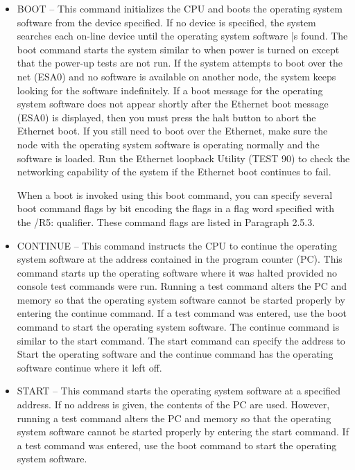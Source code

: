 \begin{itemize}
\item BOOT -- This command initializes the CPU and boots the operating 
system software from the device specified. If no device is specified, the
system searches each on-line device until the operating system software
|s found. The boot command starts the system similar to when power
is turned on except that the power-up tests are not run. If the system
attempts to boot over the net (ESA0) and no software is available on
another node, the system keeps looking for the software indefinitely.
If a boot message for the operating system software does not appear
shortly after the Ethernet boot message (ESA0) is displayed, then you
must press the halt button to abort the Ethernet boot. If you still need
to boot over the Ethernet, make sure the node with the operating system 
software is operating normally and the software is loaded. Run the
Ethernet loopback Utility (TEST 90) to check the networking capability
of the system if the Ethernet boot continues to fail.

When a boot is invoked using this boot command, you can specify
several boot command flags by bit encoding the flags in a flag word
specified with the /R5: qualifier. These command flags are listed in
Paragraph 2.5.3.

\item CONTINUE -- This command instructs the CPU to continue the 
operating system software at the address contained in the program counter
(PC). This command starts up the operating software where it was halted
provided no console test commands were run. Running a test command
alters the PC and memory so that the operating system software cannot
be started properly by entering the continue command. If a test command 
was entered, use the boot command to start the operating system
software. The continue command is similar to the start command. The
start command can specify the address to Start the operating software
and the continue command has the operating software continue where
it left off.

\item START -- This command starts the operating system software at a 
specified address. If no address is given, the contents of the PC are used.
However, running a test command alters the PC and memory so that the
operating system software cannot be started properly by entering the
start command. If a test command was entered, use the boot command
to start the operating system software.

\end{itemize}

